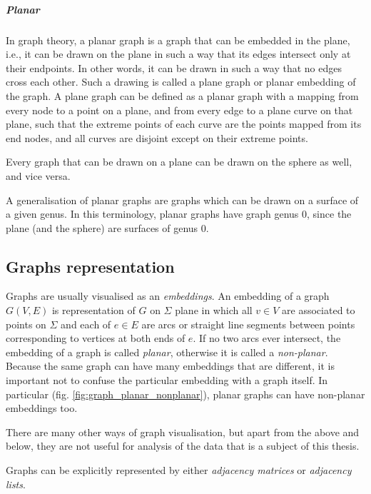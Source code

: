         \subparagraph{Planar}
        
          In graph theory, a planar graph is a graph that can be embedded in the plane, i.e., it can be drawn on the plane in such a way that its edges intersect only at their endpoints. In other words, it can be drawn in such a way that no edges cross each other\cite{Trudeau1993,Diestel2012}. Such a drawing is called a plane graph or planar embedding of the graph. A plane graph can be defined as a planar graph with a mapping from every node to a point on a plane, and from every edge to a plane curve on that plane, such that the extreme points of each curve are the points mapped from its end nodes, and all curves are disjoint except on their extreme points.

          Every graph that can be drawn on a plane can be drawn on the sphere as well, and vice versa.

          A generalisation of planar graphs are graphs which can be drawn on a surface of a given genus. In this terminology, planar graphs have graph genus $0$, since the plane (and the sphere) are surfaces of genus $0$.

  \subsection{Graphs representation}

    Graphs are usually visualised as an \emph{embeddings}. An embedding of a graph $G(V, E)$ is representation of $G$ on $\Sigma$ plane in which all $v \in V$ are associated to points on $\Sigma$ and each of $e \in E$ are arcs or straight line segments between points corresponding to vertices at both ends of $e$. If no two arcs ever intersect, the embedding of a graph is called \emph{planar}, otherwise it is called a \emph{non-planar}. Because the same graph can have many embeddings that are different, it is important not to confuse the particular embedding with a graph itself. In particular (fig. \ref{fig:graph_planar_nonplanar}), planar graphs can have non-planar embeddings too.

    There are many other ways of graph visualisation, but apart from the above and below, they are not useful for analysis of the data that is a subject of this thesis.

    Graphs can be explicitly represented by either \emph{adjacency matrices} or \emph{adjacency lists}.
        
